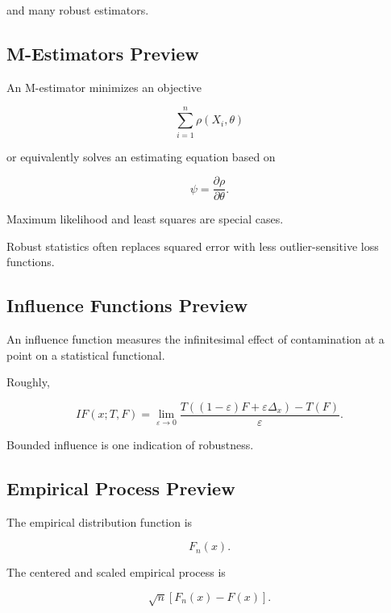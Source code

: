 and many robust estimators.

\subsection{M-Estimators Preview}
\label{subsec:m-estimators-preview}

An M-estimator minimizes an objective

\[
\boxed{
\sum_{i=1}^{n}
\rho
(
X_i,\theta
)
}
\]

or equivalently solves an estimating equation based on

\[
\psi
=
\frac{
\partial\rho
}{
\partial\theta
}.
\]

Maximum likelihood and least squares are special cases.

Robust statistics often replaces squared error with less outlier-sensitive
loss functions.

\subsection{Influence Functions Preview}
\label{subsec:influence-functions-preview}

An influence function measures the infinitesimal effect of contamination
at a point on a statistical functional.

Roughly,

\[
\boxed{
IF(x;T,F)
=
\lim_{\varepsilon\to0}
\frac{
T
(
(1-\varepsilon)F+\varepsilon\Delta_x
)
-
T(F)
}{
\varepsilon
}.
}
\]

Bounded influence is one indication of robustness.

\subsection{Empirical Process Preview}
\label{subsec:empirical-process-preview-mathstat}

The empirical distribution function is

\[
F_n(x).
\]

The centered and scaled empirical process is

\[
\boxed{
\sqrt{n}
[
F_n(x)-F(x)
].
}
\]

